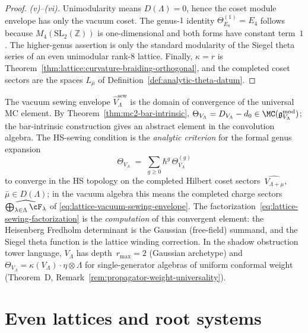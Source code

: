 \begin{proof}
\smallskip\noindent\emph{(v)--(vi).}
Unimodularity means $D(\Lambda)=0$, hence the coset module envelope
has only the vacuum coset. The genus-$1$ identity
$\Theta_{E_8}^{(1)}=E_4$ follows because $M_4(\mathrm{SL}_2(\mathbb Z))$
is one-dimensional and both forms have constant term~$1$.
The higher-genus assertion is only the standard modularity of the
Siegel theta series of an even unimodular rank-$8$ lattice. Finally,
$\kappa=r$ is Theorem~\ref{thm:lattice:curvature-braiding-orthogonal},
and the completed coset sectors are the spaces
$L_{\bar\mu}$ of Definition~\ref{def:analytic-theta-datum}.
\end{proof}

\begin{remark}%
\label{rem:lattice-sewing-convolution}%
%
The vacuum sewing envelope $\widehat V_\Lambda^{\mathrm{sew}}$ is the domain
of convergence of the universal MC element. By
Theorem~\ref{thm:mc2-bar-intrinsic},
$\Theta_{V_\Lambda} = D_{V_\Lambda} - d_0 \in
\MC(\mathfrak{g}^{\mathrm{mod}}_{V_\Lambda})$; the bar-intrinsic construction gives
an abstract element in the convolution algebra. The HS-sewing
condition is the \emph{analytic criterion} for the formal
genus expansion
\[
\Theta_{V_\Lambda}
\;=\;
\sum_{g \geq 0} \hbar^g \,\Theta_{V_\Lambda}^{(g)}
\]
to converge in the HS topology on the completed Hilbert
coset sectors~$\widehat{V_{\Lambda+\mu}}$,
$\bar\mu\in D(\Lambda)$; in the vacuum algebra this means the
completed charge sectors
$\widehat{\bigoplus_{\lambda\in\Lambda}\cF_\lambda}$ of
\eqref{eq:lattice-vacuum-sewing-envelope}. The factorization~\eqref{eq:lattice-sewing-factorization}
is the \emph{computation} of this convergent element:
the Heisenberg Fredholm determinant is the Gaussian
(free-field) summand, and the Siegel theta function is the
lattice winding correction. In the shadow obstruction tower language,
$V_\Lambda$ has depth~$r_{\max} = 2$ (Gaussian archetype) and
$\Theta_{V_\Lambda} = \kappa(V_\Lambda) \cdot \eta \otimes \Lambda$
for single-generator algebras of uniform conformal weight (Theorem~D, Remark~\ref{rem:propagator-weight-universality}).
\end{remark}

\section{Even lattices and root systems}%
\label{sec:lattice:lattices}%

